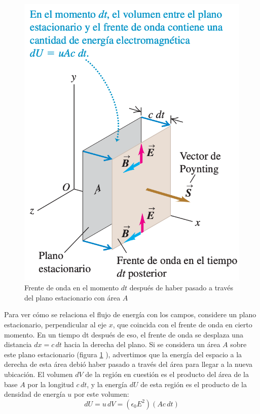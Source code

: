 \begin{figure}
\begin{center}
\includegraphics[scale=0.5]{fig/3217}
\caption{Frente de onda en el momento $dt$ después de haber pasado a través del plano estacionario con área $A$}
\label{fig:32.17}
\end{center}
\end{figure}


Para ver cómo se relaciona el flujo de energía con los campos, considere un plano estacionario, perpendicular al eje $x$, que coincida con el frente de onda en cierto momento. En un tiempo dt después de eso, el frente de onda se desplaza una distancia $dx = c\, dt$ hacia la derecha del plano. Si se considera un área $A$ sobre este plano estacionario (figura \ref{fig:32.17} ), advertimos que la energía del espacio a la derecha de esta área debió haber pasado a través del área para llegar a la nueva ubicación. El volumen $dV$ de la región en cuestión es el producto del área de la base $A$ por la longitud $c\, dt$, y la energía $dU$ de esta región es el producto de la densidad de energía $u$ por este volumen: $$dU=u\, dV=(\epsilon_0E^2)(Ac\, dt)$$

